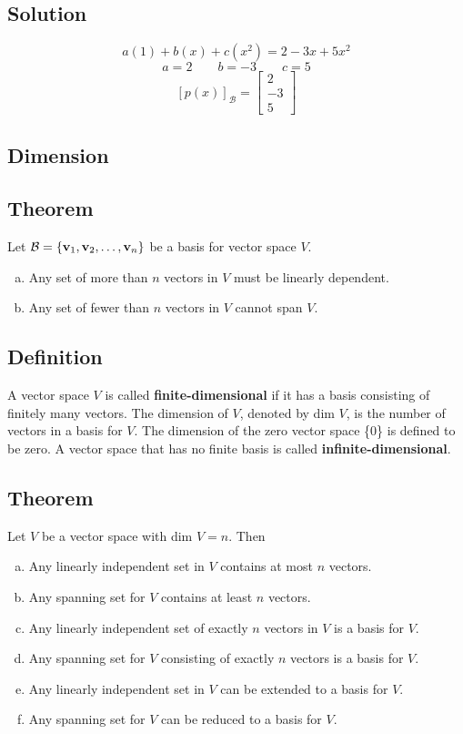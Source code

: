 \subsection*{Solution}
\[a(1)+b(x)+c(x^2)=2-3x+5x^2\]
\[a=2 \qquad b=-3 \qquad c=5\]
\[[p(x)]_\mathcal{B}=\begin{bmatrix}
        2 \\-3\\5
    \end{bmatrix}\]

\subsection*{Dimension}

\subsection*{Theorem}
Let $\mathcal{B}=\{\mathbf{v}_1,\mathbf{v}_2,\dots,\mathbf{v}_n\}$ be a basis for vector space $V$.
\begin{enumerate}[(a)]
    \item Any set of more than $n$ vectors in $V$ must be linearly dependent.
    \item Any set of fewer than $n$ vectors in $V$ cannot span $V$.
\end{enumerate}

\subsection*{Definition}
A vector space $V$ is called \textbf{finite-dimensional} if it has a basis
consisting of finitely many vectors. The dimension of $V$, denoted by dim $V$, is
the number of vectors in a basis for $V$. The dimension of the zero vector space
\{0\} is defined to be zero. A vector space that has no finite basis is called \textbf{infinite-dimensional}.

\subsection*{Theorem}
Let $V$ be a vector space with dim $V = n$. Then
\begin{enumerate}[(a)]
    \item Any linearly independent set in $V$ contains at most $n$ vectors.
    \item Any spanning set for $V$ contains at least $n$ vectors.
    \item Any linearly independent set of exactly $n$ vectors in $V$ is a basis for $V$.
    \item Any spanning set for $V$ consisting of exactly $n$ vectors is a basis for $V$.
    \item Any linearly independent set in $V$ can be extended to a basis for $V$.
    \item Any spanning set for $V$ can be reduced to a basis for $V$.
\end{enumerate}

